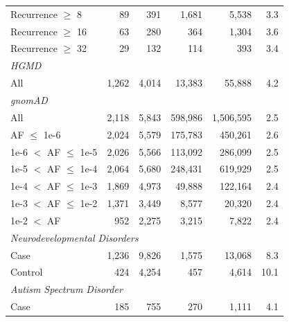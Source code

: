 \begin{tabular}{lrrrrr}
\quad Recurrence $\geq$ 8 & 89 & 391 & 1{,}681 & 5{,}538 & 3.3 \\
\quad Recurrence $\geq$ 16 & 63 & 280 & 364 & 1{,}304 & 3.6 \\
\quad Recurrence $\geq$ 32 & 29 & 132 & 114 & 393 & 3.4 \\
\hline
\multicolumn{6}{l}{\textit{HGMD}} \\
\quad All & 1{,}262 & 4{,}014 & 13{,}383 & 55{,}888 & 4.2 \\
\hline
\multicolumn{6}{l}{\textit{gnomAD}} \\
\quad All & 2{,}118 & 5{,}843 & 598{,}986 & 1{,}506{,}595 & 2.5 \\
\quad AF $\leq$ 1e-6 & 2{,}024 & 5{,}579 & 175{,}783 & 450{,}261 & 2.6 \\
\quad 1e-6 $<$ AF $\leq$ 1e-5 & 2{,}026 & 5{,}566 & 113{,}092 & 286{,}099 & 2.5 \\
\quad 1e-5 $<$ AF $\leq$ 1e-4 & 2{,}064 & 5{,}680 & 248{,}431 & 619{,}929 & 2.5 \\
\quad 1e-4 $<$ AF $\leq$ 1e-3 & 1{,}869 & 4{,}973 & 49{,}888 & 122{,}164 & 2.4 \\
\quad 1e-3 $<$ AF $\leq$ 1e-2 & 1{,}371 & 3{,}449 & 8{,}577 & 20{,}320 & 2.4 \\
\quad 1e-2 $<$ AF & 952 & 2{,}275 & 3{,}215 & 7{,}822 & 2.4 \\
\hline
\multicolumn{6}{l}{\textit{Neurodevelopmental Disorders}} \\
\quad Case & 1{,}236 & 9{,}826 & 1{,}575 & 13{,}068 & 8.3 \\
\quad Control & 424 & 4{,}254 & 457 & 4{,}614 & 10.1 \\
\hline
\multicolumn{6}{l}{\textit{Autism Spectrum Disorder}} \\
\quad Case & 185 & 755 & 270 & 1{,}111 & 4.1 \\
\hline
\end{tabular}

